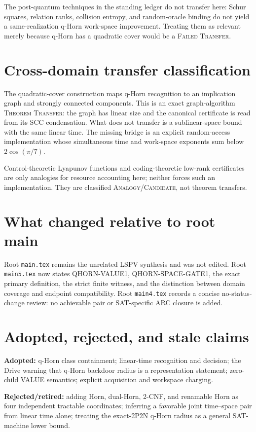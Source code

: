 \documentclass[11pt]{article}
\begin{document}
The post-quantum techniques in the standing ledger do not transfer here:
Schur squares, relation ranks, collision entropy, and random-oracle binding
do not yield a same-realization q-Horn work-space improvement.  Treating them
as relevant merely because q-Horn has a quadratic cover would be a
\textsc{Failed Transfer}.

\section{Cross-domain transfer classification}
The quadratic-cover construction maps q-Horn recognition to an implication
graph and strongly connected components.  This is an exact graph-algorithm
\textsc{Theorem Transfer}: the graph has linear size and the canonical
certificate is read from its SCC condensation.  What does not transfer is a
sublinear-space bound with the same linear time.  The missing bridge is an
explicit random-access implementation whose simultaneous time and work-space
exponents sum below $2\cos(\pi/7)$.

Control-theoretic Lyapunov functions and coding-theoretic low-rank
certificates are only analogies for resource accounting here; neither forces
such an implementation.  They are classified \textsc{Analogy/Candidate},
not theorem transfers.

\section{What changed relative to root main}
Root \texttt{main.tex} remains the unrelated LSPV synthesis and was not
edited.  Root \texttt{main5.tex} now states QHORN-VALUE1,
QHORN-SPACE-GATE1, the exact primary definition, the strict finite witness,
and the distinction between domain coverage and endpoint compatibility.
Root \texttt{main4.tex} records a concise no-status-change review: no
achievable pair or SAT-specific ARC closure is added.

\section{Adopted, rejected, and stale claims}
\textbf{Adopted:} q-Horn class containment; linear-time recognition and
decision; the Drive warning that q-Horn backdoor radius is a representation
statement; zero-child VALUE semantics; explicit acquisition and workspace
charging.

\textbf{Rejected/retired:} adding Horn, dual-Horn, 2-CNF, and renamable Horn
as four independent tractable coordinates; inferring a favorable joint
time--space pair from linear time alone; treating the exact-2P2N q-Horn
radius as a general SAT-machine lower bound.
\end{document}
